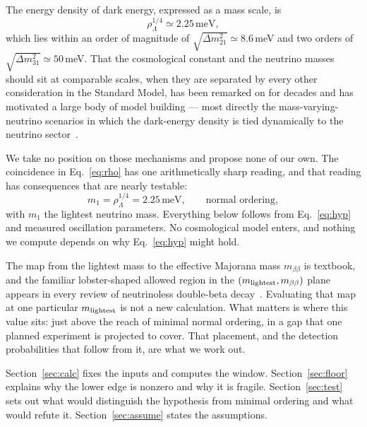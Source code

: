 \documentclass[aps,prd,twocolumn,superscriptaddress,nofootinbib,10pt]{revtex4-2}
\begin{document}
The energy density of dark energy, expressed as a mass scale, is
%
\begin{equation}
  \rho_\Lambda^{1/4} \simeq 2.25\,\mathrm{meV},
  \label{eq:rho}
\end{equation}
%
which lies within an order of magnitude of $\sqrt{\Delta m^2_{21}} \simeq 8.6\,$meV and two orders
of $\sqrt{\Delta m^2_{31}} \simeq 50\,$meV. That the cosmological constant and the neutrino masses
should sit at comparable scales, when they are separated by every other consideration in the
Standard Model, has been remarked on for decades and has motivated a large body of model building
--- most directly the mass-varying-neutrino scenarios in which the dark-energy density is tied
dynamically to the neutrino sector~\cite{FardonNelsonWeiner2004,PecceiMaVaN2005}.

We take no position on those mechanisms and propose none of our own. The coincidence in
Eq.~\eqref{eq:rho} has one arithmetically sharp reading, and that reading has consequences that are
nearly testable:
%
\begin{equation}
  m_1 = \rho_\Lambda^{1/4} = 2.25\,\mathrm{meV}, \qquad \text{normal ordering},
  \label{eq:hyp}
\end{equation}
%
with $m_1$ the lightest neutrino mass. Everything below follows from Eq.~\eqref{eq:hyp} and measured
oscillation parameters. No cosmological model enters, and nothing we compute depends on why
Eq.~\eqref{eq:hyp} might hold.

The map from the lightest mass to the effective Majorana mass $m_{\beta\beta}$ is textbook, and the
familiar lobster-shaped allowed region in the $(m_{\rm lightest}, m_{\beta\beta})$ plane appears in
every review of neutrinoless double-beta decay~\cite{DellOroReview2016,AgostiniReview2023}.
Evaluating that map at one particular $m_{\rm lightest}$ is not a new calculation. What matters is
where this value sits: just above the reach of minimal normal ordering, in a gap that one planned
experiment is projected to cover. That placement, and the detection probabilities that follow from
it, are what we work out.

Section~\ref{sec:calc} fixes the inputs and computes the window. Section~\ref{sec:floor} explains
why the lower edge is nonzero and why it is fragile. Section~\ref{sec:test} sets out what would
distinguish the hypothesis from minimal ordering and what would refute it. Section~\ref{sec:assume}
states the assumptions.

\end{document}
